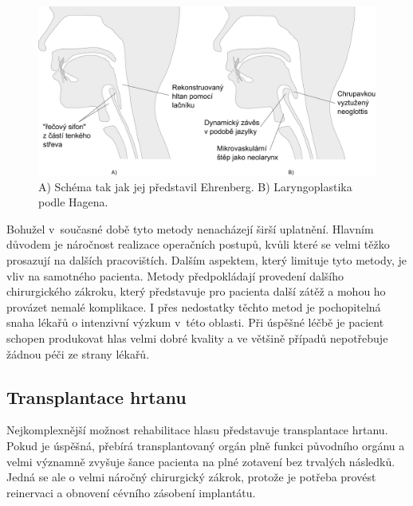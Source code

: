 \begin{figure}[htb]
  \begin{center}
    \includegraphics[width=0.9\linewidth]{ch3-cause/figures/microvascular}
    \caption[Schéma  a laryngoplastiky.]{A) Schéma  tak jak jej představil Ehrenberg. B) Laryngoplastika podle Hagena.}
    \label{fig:cause:treatment:microvascular}
  \end{center}
\end{figure}

Bohužel v~současné době tyto metody nenacházejí širší uplatnění. Hlavním důvodem je
náročnost realizace operačních postupů, kvůli které se velmi
těžko prosazují na dalších pracovištích. Dalším aspektem, který limituje tyto
metody, je vliv na samotného pacienta. Metody předpokládají provedení dalšího chirurgického
zákroku, který představuje pro pacienta další zátěž a mohou ho provázet nemalé komplikace.
I přes nedostatky těchto metod je
pochopitelná snaha lékařů o intenzivní výzkum v~této oblasti. Při úspěšné
léčbě je pacient schopen produkovat hlas velmi dobré kvality a ve většině
případů nepotřebuje žádnou péči ze strany lékařů.


\subsection{Transplantace hrtanu}
\label{chap:cause:treatment:transplantation}

Nejkomplexnější možnost rehabilitace hlasu představuje transplantace hrtanu.
Pokud je úspěšná, přebírá transplantovaný orgán plně funkci původního
orgánu a velmi významně zvyšuje šance pacienta na plné zotavení bez trvalých
následků. Jedná se ale o velmi náročný chirurgický zákrok, protože je potřeba provést reinervaci a obnovení cévního zásobení implantátu.

